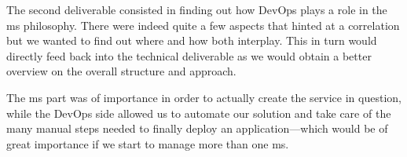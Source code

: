 The second deliverable consisted in finding out how DevOps plays a
role in the \gls{ms} philosophy. There were indeed quite a few aspects
that hinted at a correlation but we wanted to find out where and how
both interplay. This in turn would directly feed back into the
technical deliverable as we would obtain a better overview on the
overall structure and approach.

The \gls{ms} part was of importance in order to actually create the
service in question, while the DevOps side allowed us to automate our
solution and take care of the many manual steps needed to finally
deploy an application---which would be of great importance if we start
to manage more than one \gls{ms}.




